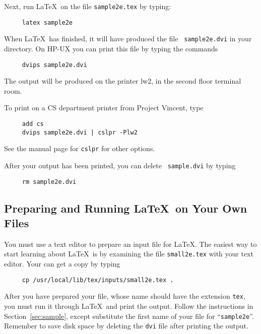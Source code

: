 \documentclass{article}
\begin{document}
Next, run \LaTeX\ on the file \mbox{\tt sample2e.tex} by typing:
\begin{verbatim}
     latex sample2e
\end{verbatim}
When \LaTeX\ has finished, it will have produced the file \mbox{\tt
sample2e.dvi} in your directory.  On HP-UX you can print this file
by typing the commands
\begin{verbatim}
     dvips sample2e.dvi
\end{verbatim}
The output will be produced on the printer lw2, in the second floor
terminal room.

To print on a CS department printer from Project Vincent, type
\begin{verbatim}
     add cs
     dvips sample2e.dvi | cslpr -Plw2
\end{verbatim}
See the manual page for {\tt cslpr} for other options.

After your output has been printed, you can delete \mbox{\tt
sample.dvi} by typing
\begin{verbatim}
     rm sample2e.dvi 
\end{verbatim}

\subsection{Preparing and Running \LaTeX\ on Your Own Files}

You must use a text editor to prepare an input file for \LaTeX.
The easiest way to start learning about \LaTeX\ is by 
examining the file \mbox{\tt small2e.tex} with your text editor.
Your can get a copy by typing
\begin{verbatim}
     cp /usr/local/lib/tex/inputs/small2e.tex .
\end{verbatim}

After you have prepared your file, whose name should have the extension
{\tt tex}, you must run it through \LaTeX\ and print the output.
Follow the instructions in Section~\ref{sec:sample}, except substitute
the first name of your file for ``\mbox{\tt sample2e}''.  Remember to
save disk space by deleting the {\tt dvi} file after printing the
output.


\end{document}

